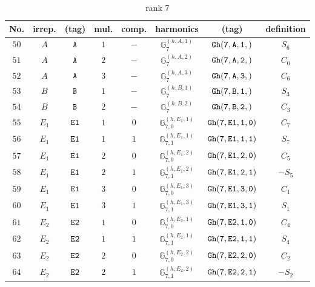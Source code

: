 \documentclass[fleqn,8pt]{jsarticle}
\begin{document}
\begin{table}[ht!]
\begin{center}
\caption{rank 7}
\renewcommand{\arraystretch}{1.3}
\begin{tabular}{cccccccc} \hline \hline
No. & irrep. & (tag) & mul. & comp. & harmonics & (tag) & definition \\ \hline
$ 50 $ & $ A $ & $ {\tt A} $ & $ 1 $ & $ - $ & $ \mathbb{G}_{7}^{(h,A,1)} $ & $ {\tt Gh(7,A,1,)} $ & $ S_{6} $ \\
$ 51 $ & $ A $ & $ {\tt A} $ & $ 2 $ & $ - $ & $ \mathbb{G}_{7}^{(h,A,2)} $ & $ {\tt Gh(7,A,2,)} $ & $ C_{0} $ \\
$ 52 $ & $ A $ & $ {\tt A} $ & $ 3 $ & $ - $ & $ \mathbb{G}_{7}^{(h,A,3)} $ & $ {\tt Gh(7,A,3,)} $ & $ C_{6} $ \\
$ 53 $ & $ B $ & $ {\tt B} $ & $ 1 $ & $ - $ & $ \mathbb{G}_{7}^{(h,B,1)} $ & $ {\tt Gh(7,B,1,)} $ & $ S_{3} $ \\
$ 54 $ & $ B $ & $ {\tt B} $ & $ 2 $ & $ - $ & $ \mathbb{G}_{7}^{(h,B,2)} $ & $ {\tt Gh(7,B,2,)} $ & $ C_{3} $ \\
$ 55 $ & $ E_{1} $ & $ {\tt E1} $ & $ 1 $ & $ 0 $ & $ \mathbb{G}_{7,0}^{(h,E_{1},1)} $ & $ {\tt Gh(7,E1,1,0)} $ & $ C_{7} $ \\
$ 56 $ & $ E_{1} $ & $ {\tt E1} $ & $ 1 $ & $ 1 $ & $ \mathbb{G}_{7,1}^{(h,E_{1},1)} $ & $ {\tt Gh(7,E1,1,1)} $ & $ S_{7} $ \\
$ 57 $ & $ E_{1} $ & $ {\tt E1} $ & $ 2 $ & $ 0 $ & $ \mathbb{G}_{7,0}^{(h,E_{1},2)} $ & $ {\tt Gh(7,E1,2,0)} $ & $ C_{5} $ \\
$ 58 $ & $ E_{1} $ & $ {\tt E1} $ & $ 2 $ & $ 1 $ & $ \mathbb{G}_{7,1}^{(h,E_{1},2)} $ & $ {\tt Gh(7,E1,2,1)} $ & $ - S_{5} $ \\
$ 59 $ & $ E_{1} $ & $ {\tt E1} $ & $ 3 $ & $ 0 $ & $ \mathbb{G}_{7,0}^{(h,E_{1},3)} $ & $ {\tt Gh(7,E1,3,0)} $ & $ C_{1} $ \\
$ 60 $ & $ E_{1} $ & $ {\tt E1} $ & $ 3 $ & $ 1 $ & $ \mathbb{G}_{7,1}^{(h,E_{1},3)} $ & $ {\tt Gh(7,E1,3,1)} $ & $ S_{1} $ \\
$ 61 $ & $ E_{2} $ & $ {\tt E2} $ & $ 1 $ & $ 0 $ & $ \mathbb{G}_{7,0}^{(h,E_{2},1)} $ & $ {\tt Gh(7,E2,1,0)} $ & $ C_{4} $ \\
$ 62 $ & $ E_{2} $ & $ {\tt E2} $ & $ 1 $ & $ 1 $ & $ \mathbb{G}_{7,1}^{(h,E_{2},1)} $ & $ {\tt Gh(7,E2,1,1)} $ & $ S_{4} $ \\
$ 63 $ & $ E_{2} $ & $ {\tt E2} $ & $ 2 $ & $ 0 $ & $ \mathbb{G}_{7,0}^{(h,E_{2},2)} $ & $ {\tt Gh(7,E2,2,0)} $ & $ C_{2} $ \\
$ 64 $ & $ E_{2} $ & $ {\tt E2} $ & $ 2 $ & $ 1 $ & $ \mathbb{G}_{7,1}^{(h,E_{2},2)} $ & $ {\tt Gh(7,E2,2,1)} $ & $ - S_{2} $ \\
 \hline \hline
\end{tabular}
\end{center}
\end{table}
\end{document}
